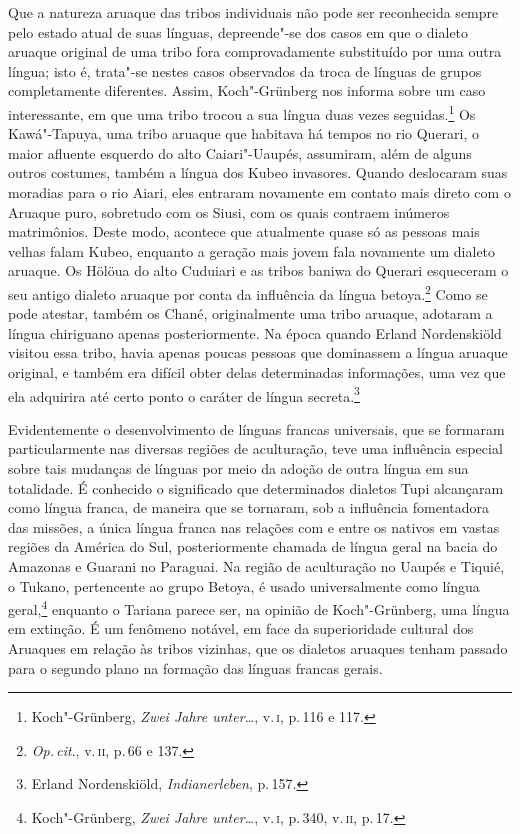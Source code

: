 Que a natureza aruaque das tribos individuais não pode ser reconhecida
sempre pelo estado atual de suas línguas, depreende"-se dos casos em que
o dialeto aruaque original de uma tribo fora comprovadamente substituído
por uma outra língua; isto é, trata"-se nestes casos observados da troca
de línguas de grupos completamente diferentes. Assim, Koch"-Grünberg nos
informa sobre um caso interessante, em que uma tribo trocou a sua língua
duas vezes seguidas.\footnote{Koch"-Grünberg, \textit{Zwei Jahre unter\ldots}, v.\,\textsc{i}, p.\,116 e 117.} Os Kawá"-Tapuya, uma tribo aruaque que
habitava há tempos no rio Querari, o maior afluente esquerdo do alto
Caiari"-Uaupés, assumiram, além de alguns outros costumes, também a
língua dos Kubeo invasores. Quando deslocaram suas moradias para o rio
Aiari, eles entraram novamente em contato mais direto com o Aruaque
puro, sobretudo com os Siusi, com os quais contraem inúmeros
matrimônios. Deste modo, acontece que atualmente quase só as pessoas
mais velhas falam Kubeo, enquanto a geração mais jovem fala novamente um
dialeto aruaque. Os Hölöua do alto Cuduiari e as tribos baniwa do
Querari esqueceram o seu antigo dialeto aruaque por conta da influência
da língua betoya.\footnote{\textit{Op.\,cit}., v.\,\textsc{ii}, p.\,66 e 137.} Como se pode
atestar, também os Chané, originalmente uma tribo aruaque, adotaram a
língua chiriguano apenas posteriormente. Na época quando Erland
Nordenskiöld visitou essa tribo, havia apenas poucas pessoas que
dominassem a língua aruaque original, e também era difícil obter delas
determinadas informações, uma vez que ela adquirira até
certo ponto o caráter de língua secreta.\footnote{Erland Nordenskiöld,
  \textit{Indianerleben}, p.\,157.}

Evidentemente o desenvolvimento de línguas francas universais, que se
formaram particularmente nas diversas regiões de aculturação, teve uma
influência especial sobre tais mudanças de línguas por meio da adoção
de outra língua em sua totalidade. É conhecido o significado que
determinados dialetos Tupi alcançaram como língua franca, de maneira que
se tornaram, sob a influência fomentadora das missões, a única língua
franca nas relações com e entre os nativos em vastas regiões da América
do Sul, posteriormente chamada de língua geral na bacia do Amazonas e
Guarani no Paraguai. Na região de aculturação no Uaupés e Tiquié, o
Tukano, pertencente ao grupo Betoya, é usado universalmente como língua
geral,\footnote{Koch"-Grünberg, \textit{Zwei Jahre unter\ldots}, v.\,\textsc{i}, p.\,340, v.\,\textsc{ii}, p.\,17.} enquanto o Tariana parece ser, na opinião
de Koch"-Grünberg, uma língua em extinção. É um fenômeno notável, em face
da superioridade cultural dos Aruaques em relação às tribos vizinhas, que
os dialetos aruaques tenham passado para o segundo plano na formação
das línguas francas gerais.

